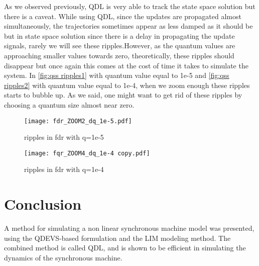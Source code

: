 \documentclass{scspaperproc}
\theoremstyle{scsthe}
\begin{document}
As we observed previously, QDL is very able to track the state space solution but there is a caveat. While using QDL, since the updates are propagated almost simultaneously, the trajectories sometimes appear as less damped as it should be but in state space solution since there is a delay in propagating the update signals, rarely we will see these ripples.However, as the quantum values are approaching smaller values towards zero, theoretically, these ripples should disappear but once again this comes at the cost of time it takes to simulate the system. In \autoref{fig:qss ripples1}  with quantum value equal to 1e-5 and \autoref{fig:qss ripples2} with quantum value equal to 1e-4, when we zoom enough these ripples starts to bubble up. As we said, one might want to get rid of these ripples by choosing a quantum size almost near zero.
\begin{figure}[H]
  \FloatBarrier
    \centering
    \texttt{[image: fdr\_ZOOM2\_dq\_1e-5.pdf]}
    \caption{ripples in fdr with q=1e-5 }
    \label{fig:qss ripples1}
\end{figure}

\begin{figure}[H]
  \FloatBarrier
    \centering
    \texttt{[image: fqr\_ZOOM4\_dq\_1e-4 copy.pdf]}
    \caption{ripples in fdr with q=1e-4}
    \label{fig:qss ripples2}
\end{figure}



\section{Conclusion}

A method for simulating a non linear synchronous machine model was presented, using the QDEVS-based formulation and the LIM modeling method. The combined method is called QDL, and is shown to be efficient in simulating the dynamics of the synchronous machine.




\end{document}
